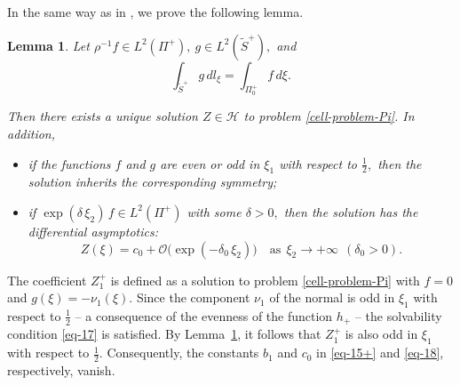 \documentclass[reqno]{amsart}            %
\newtheorem{lemma}{Lemma}[section]
\numberwithin{equation}{section}
\begin{document}
	In the same way as in \cite[\S 4.2]{Mel-1999}, we prove the following lemma.
	\begin{lemma}\label{lemma-4-1}
		Let $\rho^{-1} f\in L^2(\Pi^+), \ g \in L^2(\tilde{S}^+),$ and 
		\begin{equation}\label{eq-17}
			\int_{\tilde{S}^+} g\, dl_\xi = \int_{\Pi^+_0}f \, d\xi .
		\end{equation}
		
		Then there exists a unique solution $Z \in \mathcal{H}$ to problem \eqref{cell-problem-Pi}.
		In addition,
		\begin{itemize}
			\item  if the functions $f$ and $g$ are even or odd in $\xi_1$ with respect to $\frac12,$ then the solution inherits the corresponding symmetry;
			\item 
			if $\exp(\delta\, \xi_2)\, f \in L^2(\Pi^+)$ with some $\delta >0,$ then the solution has the differential asymptotics:
			\begin{equation}\label{eq-18}
				Z(\xi) = c_0 + \mathcal{O}\big(\exp(-\delta_0 \, \xi_2) \big) \quad \text{as} \ \ \xi_2 \to +\infty \ \ (\delta_0 > 0).  
			\end{equation}
		\end{itemize}
	\end{lemma}
	
	The coefficient $Z^+_1$ is defined as a solution to problem \eqref{cell-problem-Pi} with $f=0$ and $g(\xi) = - \nu_1(\xi).$ 
	Since the component $\nu_1$ of the normal is  odd  in $\xi_1$ with respect to $\frac{1}{2}$ -- a consequence of  the evenness of the function $h_+$ --  the solvability condition \eqref{eq-17} is satisfied. By Lemma~\ref{lemma-4-1}, it follows that  $Z^+_1$ is also odd  in $\xi_1$ with respect to $\frac{1}{2}.$ Consequently, the constants $b_1$ and $c_0$ in \eqref{eq-15+} and \eqref{eq-18}, respectively, vanish. 
	
\end{document}
